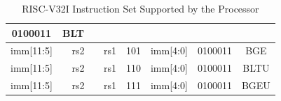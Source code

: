 \documentclass[10pt,letterpaper]{article}
\begin{document}
\begin{table}[H]
\begin{tabular}{|crcrcrcrcrcrc|}
		\multicolumn{2}{c|}{0100011} &
		BLT \\ \hline
		\multicolumn{2}{|c|}{imm{[}11:5{]}} &
		\multicolumn{2}{c|}{rs2} &
		\multicolumn{2}{c|}{rs1} &
		\multicolumn{2}{c|}{101} &
		\multicolumn{2}{c|}{imm{[}4:0{]}} &
		\multicolumn{2}{c|}{0100011} &
		BGE \\ \hline
		\multicolumn{2}{|c|}{imm{[}11:5{]}} &
		\multicolumn{2}{c|}{rs2} &
		\multicolumn{2}{c|}{rs1} &
		\multicolumn{2}{c|}{110} &
		\multicolumn{2}{c|}{imm{[}4:0{]}} &
		\multicolumn{2}{c|}{0100011} &
		BLTU \\ \hline
		\multicolumn{2}{|c|}{imm{[}11:5{]}} &
		\multicolumn{2}{c|}{rs2} &
		\multicolumn{2}{c|}{rs1} &
		\multicolumn{2}{c|}{111} &
		\multicolumn{2}{c|}{imm{[}4:0{]}} &
		\multicolumn{2}{c|}{0100011} &
		BGEU \\ \hline
	\end{tabular}
	\caption{RISC-V32I Instruction Set Supported by the Processor}
	\label{tab:instrSet}
\end{table}
\newpage
\end{document}
